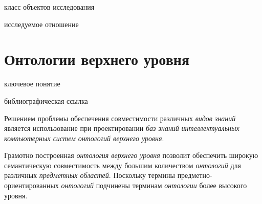 \begin{SCn}
	\begin{scnhaselementrolelist}{класс объектов исследования}
	\end{scnhaselementrolelist}
	\begin{scnhaselementrolelist}{исследуемое отношение}
	\end{scnhaselementrolelist}
\end{SCn}

\section{Онтологии верхнего уровня}
\label{sec_top_level_ontologies}

\begin{SCn}
	\begin{scnrelfromlist}{ключевое понятие}
	\end{scnrelfromlist}

\bigskip

\begin{scnrelfromlist}{библиографическая ссылка}
\end{scnrelfromlist}
\end{SCn}

Решением проблемы обеспечения совместимости различных \textit{видов знаний} является использование при проектировании \textit{баз знаний} \textit{интеллектуальных компьютерных систем} \textit{онтологий верхнего уровня}.

Грамотно построенная \textit{онтология верхнего уровня} позволит обеспечить широкую семантическую совместимость между большим количеством \textit{онтологий} для различных \textit{предметных областей}. Поскольку термины предметно-ориентированных \textit{онтологий} подчинены терминам \textit{онтологии} более высокого уровня.

